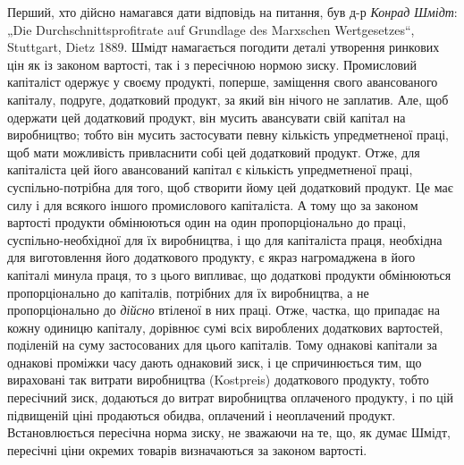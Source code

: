 Перший, хто дійсно намагався дати відповідь на питання, був
д-р \emph{Конрад Шмідт}: „Die Durchschnittsprofitrate auf Grundlage des
Marxschen Wertgesetzes“, Stuttgart, Dietz 1889. Шмідт намагається
погодити деталі утворення ринкових цін як із законом
вартості, так і з пересічною нормою зиску. Промисловий капіталіст
одержує у своєму продукті, поперше, заміщення свого
авансованого капіталу, подруге, додатковий продукт, за який
він нічого не заплатив. Але, щоб одержати цей додатковий
продукт, він мусить авансувати свій капітал на виробництво;
тобто він мусить застосувати певну кількість упредметненої
праці, щоб мати можливість привласнити собі цей додатковий продукт.
Отже, для капіталіста цей його авансований капітал є кількість
упредметненої праці, суспільно-потрібна для того, щоб
створити йому цей додатковий продукт. Це має силу і для всякого
іншого промислового капіталіста. А тому що за законом
вартості продукти обмінюються один на один пропорціонально
до праці, суспільно-необхідної для їх виробництва, і що для капіталіста
праця, необхідна для виготовлення його додаткового продукту,
є якраз нагромаджена в його капіталі минула праця, то
з цього випливає, що додаткові продукти обмінюються пропорціонально
до капіталів, потрібних для їх виробництва, а не пропорціонально
до \emph{дійсно} втіленої в них праці. Отже, частка, що
припадає на кожну одиницю капіталу, дорівнює сумі всіх вироблених
додаткових вартостей, поділеній на суму застосованих
для цього капіталів. Тому однакові капітали за однакові проміжки
часу дають однаковий зиск, і це спричинюється тим, що
вираховані так витрати виробництва (Kostpreis) додаткового
продукту, тобто пересічний зиск, додаються до витрат виробництва
оплаченого продукту, і по цій підвищеній ціні продаються
обидва, оплачений і неоплачений продукт. Встановлюється
пересічна норма зиску, не зважаючи на те, що, як
думає Шмідт, пересічні ціни окремих товарів визначаються за
законом вартості.

